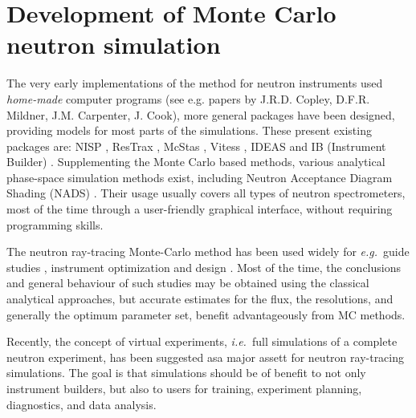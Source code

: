 \section{Development of Monte Carlo neutron simulation}
The very early implementations of the method for neutron instruments used \emph{home-made} computer programs  (see e.g. papers by J.R.D. Copley, D.F.R. Mildner, J.M. Carpenter, J. Cook), more general packages have been designed, providing models for most parts of the simulations.
These present existing packages are: NISP \cite{NISP}, ResTrax
\cite{Restrax}, McStas
, Vitess \cite{Vitess,vitess_webpage}, IDEAS \cite{IDEAS} and IB (Instrument
Builder) \cite{IB_webpage}. Supplementing the Monte Carlo based
methods, various analytical phase-space simulation methods exist,
including Neutron Acceptance Diagram Shading (NADS) \cite{NADS_webpage}.
Their usage usually covers all types of neutron spectrometers, most of the time through a user-friendly graphical interface, without requiring programming skills.

The neutron ray-tracing Monte-Carlo method has been used widely for
{\em e.g.}\ guide studies \cite{Copley93,Farhi02,Schanzer04},
instrument optimization and design \cite{Zsigmond04,Lieutenant05}.
Most of the time, the conclusions and general behaviour of such studies
may be obtained using the classical analytical approaches,
but accurate estimates for the flux, the resolutions,
and generally the optimum parameter set, benefit advantageously from MC methods.

Recently, the concept of virtual experiments, {\em i.e.}\ full simulations
of a complete neutron experiment, has been suggested asa major assett for neutron ray-tracing simulations. The goal is that
simulations should be of benefit to not only instrument builders, but also
to users for training, experiment planning, diagnostics, and data
analysis.

